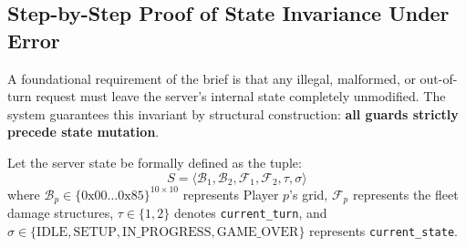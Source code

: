 \subsection{Step-by-Step Proof of State Invariance Under Error}
A foundational requirement of the brief is that any illegal, malformed, or out-of-turn request must leave the server's internal state completely unmodified. The system guarantees this invariant by structural construction: \textbf{all guards strictly precede state mutation}. 

Let the server state be formally defined as the tuple:
\begin{equation}
S = \langle \mathcal{B}_1, \mathcal{B}_2, \mathcal{F}_1, \mathcal{F}_2, \tau, \sigma \rangle
\end{equation}
where $\mathcal{B}_p \in \{0\text{x}00\ldots0\text{x}85\}^{10 \times 10}$ represents Player $p$'s grid, $\mathcal{F}_p$ represents the fleet damage structures, $\tau \in \{1, 2\}$ denotes \texttt{current\_turn}, and $\sigma \in \{\text{IDLE}, \text{SETUP}, \text{IN\_PROGRESS}, \text{GAME\_OVER}\}$ represents \texttt{current\_state}.

